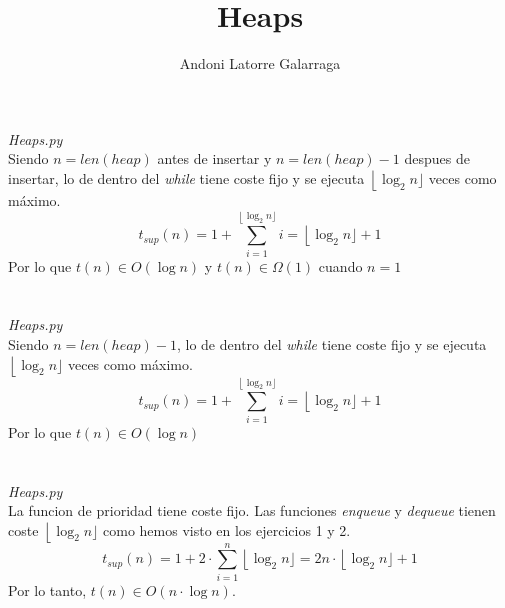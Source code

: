 \documentclass{article}
\title{Heaps}
\author{Andoni Latorre Galarraga}
\date{}
\begin{document}
\maketitle

\section{}
\textit{Heaps.py}\\
Siendo $n=len(heap)$ antes de insertar y $n=len(heap)-1$ despues de insertar, lo de dentro del \textit{while} tiene coste fijo y se ejecuta $\left \lfloor{\log_2n}\rfloor \right.$ veces como máximo.
$$
t_{sup}(n) = 1 + \sum_{i=1}^{\left \lfloor{\log_2n}\rfloor \right.} i = \left \lfloor{\log_2n}\rfloor \right. +1
$$
Por lo que $t(n) \in O(\log n)$ y $t(n) \in \Omega(1)$ cuando $n=1$
\section{}
\textit{Heaps.py}\\
Siendo $n=len(heap)-1$, lo de dentro del \textit{while} tiene coste fijo y se ejecuta $\left \lfloor{\log_2n}\rfloor \right.$ veces como máximo.
$$
t_{sup}(n) = 1 + \sum_{i=1}^{\left \lfloor{\log_2n}\rfloor \right.} i = \left \lfloor{\log_2n}\rfloor \right. +1
$$
Por lo que $t(n) \in O(\log n)$
\section{}
\textit{Heaps.py}\\
La funcion de prioridad tiene coste fijo. Las funciones \textit{enqueue} y \textit{dequeue} tienen coste $\left \lfloor{\log_2n}\rfloor \right.$ como hemos visto en los ejercicios 1 y 2.
$$
t_{sup}(n) = 1 + 2\cdot \sum_{i=1}^{n} \left \lfloor{\log_2n}\rfloor \right. = 2n \cdot \left \lfloor{\log_2n}\rfloor \right. + 1
$$
Por lo tanto, $t(n) \in O(n\cdot \log n)$.
\end{document}
